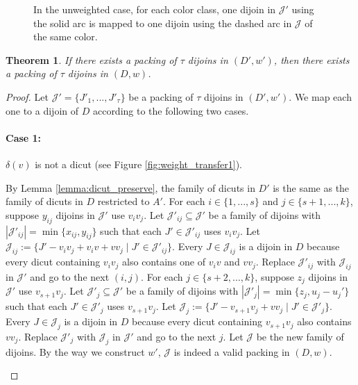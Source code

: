\documentclass[10pt,a4paper]{amsart}
\newtheorem{theorem}{Theorem}
\begin{document}
\begin{figure}[htbp]
	\centering
	
  \caption{In the unweighted case, for each color class, one dijoin in $\mathcal{J}'$ using the solid arc is mapped to one dijoin using the dashed arc in $\mathcal{J}$ of the same color.}
  \label{fig:weight_transfer2}
\end{figure}

    \begin{theorem}\label{thm:map_back}
        If there exists a packing of $\tau$ dijoins in $(D',w')$, then there exists a packing of $\tau$ dijoins in $(D,w)$.
    \end{theorem}

    \begin{proof}
    Let $\mathcal{J}'=\{J'_1,...,J'_\tau\}$ be a packing of $\tau$ dijoins in $(D',w')$. We map each one to a dijoin of $D$ according to the following two cases.
    
    \paragraph{\textbf{Case 1}:} $\delta(v)$ is not a dicut (see Figure \ref{fig:weight_transfer1}).
    
    By Lemma \ref{lemma:dicut_preserve}, the family of dicuts in $D'$ is the same as the family of dicuts in $D$ restricted to $A'$. For each $i\in\{1,...,s\}$ and $j\in\{s+1,...,k\}$, suppose $y_{ij}$ dijoins in $\mathcal{J}'$ use $v_iv_j$. Let $\mathcal{J}'_{ij}\subseteq \mathcal{J}'$ be a family of dijoins with  $|\mathcal{J}'_{ij}|=\min\{x_{ij}, y_{ij}\}$ such that each $J'\in \mathcal{J}'_{ij}$ uses $v_iv_j$. Let $\mathcal{J}_{ij}:=\{J'-v_iv_j+v_iv+vv_j\mid J'\in \mathcal{J}'_{ij}\}$. Every $J\in \mathcal{J}_{ij}$ is a dijoin in $D$ because every dicut containing $v_iv_j$ also contains one of $v_iv$ and $vv_j$. Replace $\mathcal{J}'_{ij}$ with $\mathcal{J}_{ij}$ in $\mathcal{J}'$ and go to the next $(i,j)$. For each $j\in\{s+2,...,k\}$, suppose $z_j$ dijoins in $\mathcal{J}'$ use $v_{s+1}v_j$. Let $\mathcal{J}'_j\subseteq \mathcal{J}'$ be a family of dijoins with $|\mathcal{J}'_j|=\min\{z_j,u_j-u_j'\}$ such that each $J'\in \mathcal{J}'_j$ uses $v_{s+1}v_j$. Let $\mathcal{J}_j:=\{J'-v_{s+1}v_j+vv_j\mid J'\in \mathcal{J}'_j\}$. Every $J\in \mathcal{J}_j$ is a dijoin in $D$ because every dicut containing $v_{s+1}v_j$ also contains $vv_j$. Replace $\mathcal{J}'_j$ with $\mathcal{J}_j$ in $\mathcal{J}'$ and go to the next $j$.
    Let $\mathcal{J}$ be the new family of dijoins.
    By the way we construct $w'$,  $\mathcal{J}$ is indeed a valid packing in $(D,w)$.
\begin{figure}[htbp]
	\centering
	

\end{figure}
\end{proof}
\end{document}
